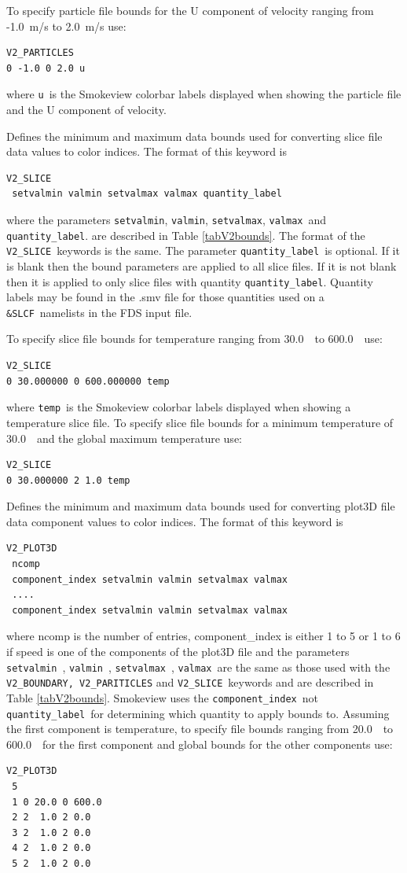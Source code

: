 \documentclass[11pt,twoside]{book}
\begin{document}
To specify particle file bounds for the U component of velocity ranging from
-1.0~m/s to 2.0~m/s use:
\begin{lstlisting}
V2_PARTICLES
0 -1.0 0 2.0 u
\end{lstlisting}
where {\tt u}\ is the Smokeview colorbar labels displayed when
showing the particle file and the U component of velocity.

Defines the minimum and maximum
data bounds used for converting slice file data values to color indices.
The format of this keyword is
\begin{lstlisting}
V2_SLICE
 setvalmin valmin setvalmax valmax quantity_label
\end{lstlisting}
where the parameters
{\tt setvalmin}, {\tt valmin}, {\tt setvalmax}, {\tt valmax}\ and {\tt quantity\_label}.
are described in Table \ref{tabV2bounds}.
The format of the {\tt V2\_SLICE}\ keywords is the same.
The parameter {\tt quantity\_label}\ is optional.  If it is blank then the bound
parameters are applied to all slice files.
If it is not blank then it is
applied to only slice files with quantity {\tt quantity\_label}.
Quantity labels may be found in the .smv file for those quantities used
on a {\tt \&SLCF}\ namelists in the FDS input file.

To specify slice file bounds for temperature ranging from
30.0~\degC\ to 600.0~\degC\ use:
\begin{lstlisting}
V2_SLICE
0 30.000000 0 600.000000 temp
\end{lstlisting}
where {\tt temp}\ is the Smokeview colorbar labels displayed when
showing a temperature slice file.
To specify slice file bounds for a minimum temperature of
30.0~\degC\ and the global maximum temperature use:
\begin{lstlisting}
V2_SLICE
0 30.000000 2 1.0 temp
\end{lstlisting}

Defines the minimum and maximum
data bounds used for converting plot3D file data component values to color indices.
The format of this keyword is
\begin{lstlisting}
V2_PLOT3D
 ncomp
 component_index setvalmin valmin setvalmax valmax
 ....
 component_index setvalmin valmin setvalmax valmax
\end{lstlisting}
where ncomp is the number of entries,
component\_index is either 1 to 5 or 1 to 6 if speed is one of the components of
the plot3D file  and
the parameters {\tt setvalmin}\ , {\tt valmin}\ ,  {\tt setvalmax}\ , {\tt valmax}\  are the same
as those used with the {\tt V2\_BOUNDARY, V2\_PARITICLES} and {\tt V2\_SLICE}\ keywords and are
described in Table \ref{tabV2bounds}. Smokeview uses the {\tt component\_index}\ not {\tt quantity\_label}\
for determining which quantity to apply bounds to.
Assuming the first component is temperature, to specify file bounds ranging from 20.0~\degC\ to
600.0~\degC\ for the first component and global bounds for the other components use:
\begin{lstlisting}
V2_PLOT3D
 5
 1 0 20.0 0 600.0
 2 2  1.0 2 0.0
 3 2  1.0 2 0.0
 4 2  1.0 2 0.0
 5 2  1.0 2 0.0
\end{lstlisting}
\end{document}
